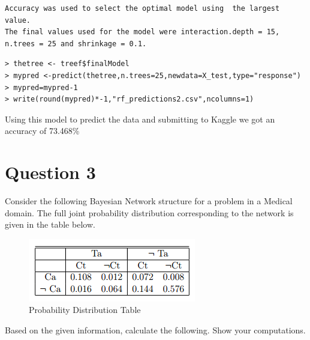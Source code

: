 \documentclass[fontsize=10pt]{scrartcl}
\begin{document}
\begin{enumerate}
\begin{verbatim}
Accuracy was used to select the optimal model using  the largest value.
The final values used for the model were interaction.depth = 15, n.trees = 25 and shrinkage = 0.1. 
\end{verbatim}

\begin{verbatim}
> thetree <- treef$finalModel
> mypred <-predict(thetree,n.trees=25,newdata=X_test,type="response")
> mypred=mypred-1
> write(round(mypred)*-1,"rf_predictions2.csv",ncolumns=1)
\end{verbatim}
		Using this model to predict the data and submitting to Kaggle we got an accuracy of 73.468\%

		\end{enumerate}


	\section{Question 3}

	Consider the following Bayesian Network structure for a problem in a Medical domain. The full joint probability distribution corresponding to the network is given in the table below.
	\begin{figure}[H]
		\begin{center}
			\includegraphics[scale=1]{resources/img3a.png}
			\caption{Probability Distribution Table}
		\end{center}
	\end{figure}

	Based on the given information, calculate the following. Show your computations.
\end{document}
